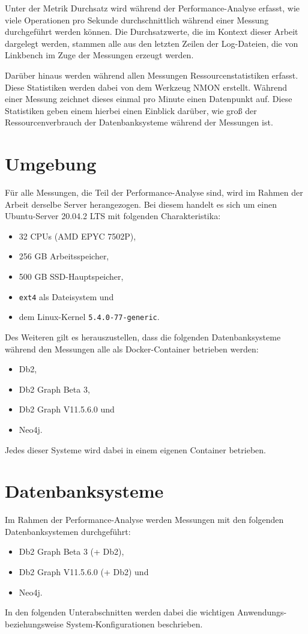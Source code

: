 Unter der Metrik Durchsatz wird während der Performance-Analyse erfasst, wie viele Operationen pro Sekunde durchschnittlich während einer Messung durchgeführt werden können. Die Durchsatzwerte, die im Kontext dieser Arbeit dargelegt werden, stammen alle aus den letzten Zeilen der Log-Dateien, die von Linkbench im Zuge der Messungen erzeugt werden.

Darüber hinaus werden während allen Messungen Ressourcenstatistiken erfasst. Diese Statistiken werden dabei von dem Werkzeug NMON erstellt. Während einer Messung zeichnet dieses einmal pro Minute  einen Datenpunkt auf. Diese Statistiken geben einem hierbei einen Einblick darüber, wie groß der Ressourcenverbrauch der Datenbanksysteme während der Messungen ist.

\section{Umgebung}
\label{analyse:umgebung}
Für alle Messungen, die Teil der Performance-Analyse sind, wird im Rahmen der Arbeit derselbe Server herangezogen. Bei diesem handelt es sich um einen Ubuntu-Server 20.04.2 LTS mit folgenden Charakteristika:
\begin{itemize}
    \item 32 CPUs (AMD EPYC 7502P), 
    \item 256 GB Arbeitsspeicher,
    \item 500 GB SSD-Hauptspeicher,
    \item \texttt{ext4} als Dateisystem und 
    \item dem Linux-Kernel \texttt{5.4.0-77-generic}.
\end{itemize}
Des Weiteren gilt es herauszustellen, dass die folgenden Datenbanksysteme während den Messungen alle als Docker-Container betrieben werden: 
\begin{itemize}
    \item Db2,
    \item Db2 Graph Beta 3,
    \item Db2 Graph V11.5.6.0 und 
    \item Neo4j. 
\end{itemize}
Jedes dieser Systeme wird dabei in einem eigenen Container betrieben. 

\section{Datenbanksysteme}
\label{analyse:datanbanksysteme}
Im Rahmen der Performance-Analyse werden Messungen mit den folgenden Datenbanksystemen durchgeführt: 
\begin{itemize}
    \item Db2 Graph Beta 3 (+ Db2),
    \item Db2 Graph V11.5.6.0 (+ Db2) und
    \item Neo4j.
\end{itemize}
In den folgenden Unterabschnitten werden dabei die wichtigen Anwendungs- beziehungsweise System-Konfigurationen beschrieben. 

